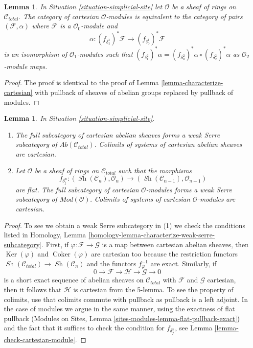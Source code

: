 \documentclass{stacks-project}
\theoremstyle{plain}
\newtheorem{lemma}[subsection]{Lemma}
\theoremstyle{definition}
\theoremstyle{remark}
\numberwithin{equation}{subsection}
\def\Sh{\mathop{\mathit{Sh}}\nolimits}
\def\Ker{\mathop{\mathrm{Ker}}}
\def\Coker{\mathop{\mathrm{Coker}}}
\begin{document}
\begin{lemma}
\label{lemma-characterize-cartesian-modules}
In Situation \ref{situation-simplicial-site}
let $\mathcal{O}$ be a sheaf of rings on $\mathcal{C}_{total}$.
The category of cartesian $\mathcal{O}$-modules
is equivalent to the category of pairs $(\mathcal{F}, \alpha)$
where $\mathcal{F}$ is a $\mathcal{O}_0$-module
and
$$
\alpha :
(f_{\delta_1^1})^*\mathcal{F}
\longrightarrow (f_{\delta_0^1})^*\mathcal{F}
$$
is an isomorphism of $\mathcal{O}_1$-modules such that
$(f_{\delta^2_1})^*\alpha =
(f_{\delta^2_0})^*\alpha \circ (f_{\delta^2_2})^*\alpha$
as $\mathcal{O}_2$-module maps.
\end{lemma}

\begin{proof}
The proof is identical to the proof of
Lemma \ref{lemma-characterize-cartesian}
with pullback of sheaves of abelian groups replaced
by pullback of modules.
\end{proof}

\begin{lemma}
\label{lemma-Serre-subcat-cartesian-modules}
In Situation \ref{situation-simplicial-site}.
\begin{enumerate}
\item The full subcategory of cartesian abelian sheaves forms a
weak Serre subcategory of $\textit{Ab}(\mathcal{C}_{total})$.
Colimits of systems of cartesian abelian sheaves are cartesian.
\item Let $\mathcal{O}$ be a sheaf of rings on $\mathcal{C}_{total}$
such that the morphisms
$$
f_{\delta^n_j} : (\Sh(\mathcal{C}_n), \mathcal{O}_n)
\to (\Sh(\mathcal{C}_{n - 1}), \mathcal{O}_{n - 1})
$$
are flat. The full subcategory of cartesian $\mathcal{O}$-modules forms a
weak Serre subcategory of $\textit{Mod}(\mathcal{O})$.
Colimits of systems of cartesian $\mathcal{O}$-modules are cartesian.
\end{enumerate}
\end{lemma}

\begin{proof}
To see we obtain a weak Serre subcategory in (1)
we check the conditions listed in
Homology, Lemma \ref{homology-lemma-characterize-weak-serre-subcategory}.
First, if $\varphi : \mathcal{F} \to \mathcal{G}$ is a map
between cartesian abelian sheaves, then
$\Ker(\varphi)$ and $\Coker(\varphi)$ are cartesian too
because the restriction functors
$\Sh(\mathcal{C}_{total}) \to \Sh(\mathcal{C}_n)$
and the functors $f_\varphi^{-1}$ are exact.
Similarly, if
$$
0 \to \mathcal{F} \to \mathcal{H} \to \mathcal{G} \to 0
$$
is a short exact sequence of abelian sheaves on $\mathcal{C}_{total}$
with $\mathcal{F}$ and $\mathcal{G}$ cartesian, then it follows that
$\mathcal{H}$ is cartesian from the 5-lemma. To see the property of
colimits, use that colimits commute with pullback as pullback is a
left adjoint. In the case of modules
we argue in the same manner, using the exactness of flat pullback
(Modules on Sites, Lemma \ref{sites-modules-lemma-flat-pullback-exact})
and the fact that it suffices to check the condition
for $f_{\delta^n_j}$, see Lemma \ref{lemma-check-cartesian-module}.
\end{proof}
\end{document}

